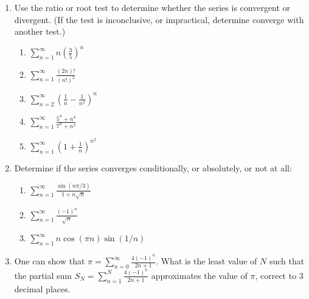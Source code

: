 \documentclass[12pt]{article}
\newcommand{\di}{\displaystyle}
\begin{document}
 \begin{enumerate}
\item Use the ratio or root test to determine whether the series is convergent or divergent. (If the test is inconclusive, or impractical, determine converge with another test.)
\begin{enumerate}
\item $\di\sum_{n=1}^\infty n\left(\frac{3}{5}\right)^n$

\vspace{1in}

\item $\di\sum_{n=1}^\infty \frac{(2n)!}{(n!)^2}$

\vspace{1in}

\item $\di\sum_{n=2}^\infty\left(\frac{1}{n}-\frac{1}{n^2}\right)^n$

\vspace{1in}

\item $\di\sum_{n=1}^\infty\frac{5^n+n^4}{7^n+n^2}$

\vspace{1in}

\item $\di\sum_{n=1}^\infty\left(1+\frac{1}{n}\right)^{n^2}$
\end{enumerate}
\newpage

\item Determine if the series converges conditionally, or absolutely, or not at all:
\begin{enumerate}
\item $\di\sum_{n=1}^\infty\frac{\sin(n\pi/3)}{1+n\sqrt{n}}$

\vspace{1in}

\item $\di\sum_{n=1}^\infty\frac{(-1)^n}{\sqrt{n}}$

\vspace{1in}

\item $\di\sum_{n=1}^\infty n\cos(\pi n)\sin(1/n)$
\end{enumerate}

\vspace{1.5in}

\item One can show that $\di \pi = \sum_{n=0}^\infty \frac{4(-1)^n}{2n+1}$. What is the least value of $N$ such that the partial sum $\di S_N=\sum_{n=1}^N \frac{4(-1)^n}{2n+1}$ approximates the value of $\pi$, correct to 3 decimal places.



\end{enumerate}
\end{document}
